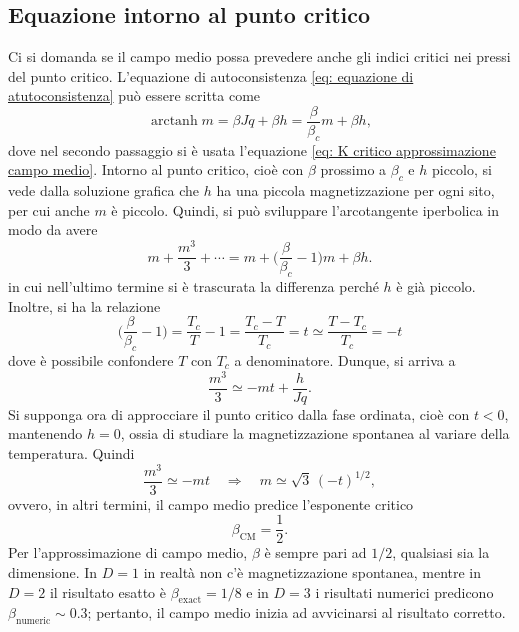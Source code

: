 \subsection{Equazione intorno al punto critico}
Ci si domanda se il campo medio possa prevedere anche gli indici critici nei pressi del punto critico. L'equazione di autoconsistenza \eqref{eq: equazione di atutoconsistenza} può essere scritta come
\begin{equation}
    \operatorname{arctanh}{m} = \beta Jq + \beta h = \frac{\beta}{\beta_c}m + \beta h,
\end{equation}
dove nel secondo passaggio si è usata l'equazione \eqref{eq: K critico approssimazione campo medio}. Intorno al punto critico, cioè con $\beta$ prossimo a $\beta_c$ e $h$ piccolo, si vede dalla soluzione grafica che $h$ ha una piccola magnetizzazione per ogni sito, per cui anche $m$ è piccolo. Quindi, si può sviluppare l'arcotangente iperbolica in modo da avere
\begin{equation}
    m + \frac{m^3}{3} + \cdots = m + \bigg(\frac{\beta}{\beta_c} - 1\bigg)m  + \beta h .
\end{equation}
in cui nell'ultimo termine si è trascurata la differenza perché $h$ è già piccolo. Inoltre, si ha la relazione 
\begin{equation}
    \bigg(\frac{\beta}{\beta_c} - 1\bigg) = \frac{T_c}{T} - 1  = \frac{T_c - T}{T_c} =  t \simeq \frac{T - T_c}{T_c} = -t
\end{equation}
dove è possibile confondere $T$ con $T_c$ a denominatore. Dunque, si arriva a 
\begin{equation}
    \frac{m^3}{3} \simeq  -mt + \frac{h}{Jq}.
\end{equation}
Si supponga ora di approcciare il punto critico dalla fase ordinata, cioè con $t < 0$, mantenendo $h = 0$, ossia di studiare la magnetizzazione spontanea al variare della temperatura. Quindi
\begin{equation}
\label{eq: valore di m per h = 0}
    \frac{m^3}{3} \simeq -mt\quad\Longrightarrow\quad m \simeq \sqrt{3}\,(-t)^{1/2},
\end{equation}
ovvero, in altri termini, il campo medio predice l'esponente critico
\begin{equation}
    \beta_{\mathrm{CM}} = \frac{1}{2} .
\end{equation}
Per l'approssimazione di campo medio, $\beta$ è sempre pari ad $1/2$, qualsiasi sia la dimensione. In $D = 1$ in realtà non c'è magnetizzazione spontanea, mentre in $D = 2$ il risultato esatto è $\beta_{\mathrm{exact}} = 1/8$ e in $D = 3$ i risultati numerici predicono $\beta_{\mathrm{numeric}} \sim 0.3$; pertanto, il campo medio inizia ad avvicinarsi al risultato corretto.

